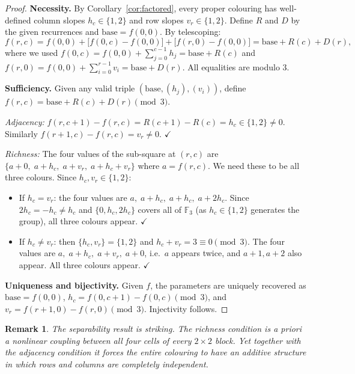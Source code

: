 \documentclass{article}
\newtheorem{remark}[theorem]{Remark}
\begin{document}
\begin{proof}
\textbf{Necessity.}
By Corollary~\ref{cor:factored}, every proper colouring has
well-defined column slopes $h_c\in\{1,2\}$ and row slopes
$v_r\in\{1,2\}$.  Define $R$ and $D$ by the given recurrences
and $\mathrm{base} = f(0,0)$.  By telescoping:
\[
  f(r,c)
  = f(0,0)
  + \bigl[f(0,c)-f(0,0)\bigr]
  + \bigl[f(r,0)-f(0,0)\bigr]
  = \mathrm{base} + R(c) + D(r),
\]
where we used $f(0,c) = f(0,0)+\sum_{j=0}^{c-1}h_j
= \mathrm{base}+R(c)$ and $f(r,0) = f(0,0)+\sum_{i=0}^{r-1}v_i
= \mathrm{base}+D(r)$.  All equalities are modulo 3.

\textbf{Sufficiency.}
Given any valid triple $(\mathrm{base},(h_j),(v_i))$, define
$f(r,c) = \mathrm{base}+R(c)+D(r)\pmod3$.

\emph{Adjacency:} $f(r,c+1)-f(r,c) = R(c+1)-R(c) = h_c
\in\{1,2\}\neq 0$.  Similarly $f(r+1,c)-f(r,c) = v_r\neq 0$.
$\checkmark$

\emph{Richness:}  The four values of the sub-square at
$(r,c)$ are $\{a+0,\;a+h_c,\;a+v_r,\;a+h_c+v_r\}$ where
$a = f(r,c)$.  We need these to be all three colours.
Since $h_c,v_r\in\{1,2\}$:
\begin{itemize}
  \item If $h_c = v_r$: the four values are $a,\;a+h_c,\;
    a+h_c,\;a+2h_c$.  Since $2h_c = -h_c\neq h_c$ and
    $\{0,h_c,2h_c\}$ covers all of $\mathbb{F}_3$
    (as $h_c\in\{1,2\}$ generates the group), all three colours
    appear. $\checkmark$
  \item If $h_c\neq v_r$: then $\{h_c,v_r\}=\{1,2\}$ and
    $h_c+v_r = 3\equiv 0\pmod3$.  The four values are
    $a,\;a+h_c,\;a+v_r,\;a+0$, i.e.\ $a$ appears twice,
    and $a+1,a+2$ also appear.  All three colours appear.
    $\checkmark$
\end{itemize}

\textbf{Uniqueness and bijectivity.}
Given $f$, the parameters are uniquely recovered as
$\mathrm{base} = f(0,0)$, $h_c = f(0,c+1)-f(0,c)\pmod3$,
and $v_r = f(r+1,0)-f(r,0)\pmod3$.  Injectivity follows.
\end{proof}

\begin{remark}
The separability result is striking.  The richness condition
is \emph{a priori} a nonlinear coupling between all four cells
of every $2\times 2$ block.  Yet together with the adjacency
condition it forces the entire colouring to have an additive
structure in which rows and columns are completely independent.
\end{remark}
\end{document}
